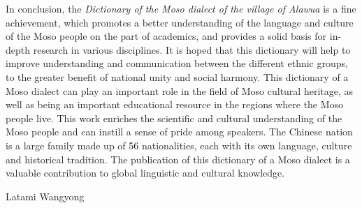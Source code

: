In conclusion, the \emph{Dictionary of the Moso dialect of the village of Alawua} is a fine achievement, which promotes a better understanding of the language and culture of the Moso people on the part of academics, and provides a solid basis for in-depth research in various disciplines. It is hoped that this dictionary will help to improve understanding and communication between the different ethnic groups, to the greater benefit of national unity and social harmony. This dictionary of a Moso dialect can play an important role in the field of Moso cultural heritage, as well as being an important educational resource in the regions where the Moso people live. This work enriches the scientific and cultural understanding of the Moso people and can instill a sense of pride among speakers. The Chinese nation is a large family made up of 56 nationalities, each with its own language, culture and historical tradition. The publication of this dictionary of a Moso dialect is a valuable contribution to global linguistic and cultural knowledge.

{\raggedleft Latami Wangyong \par}

